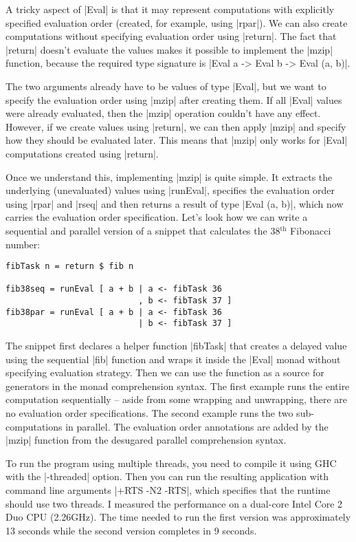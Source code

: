 \documentclass{tmr}
\renewcommand{\th}{\ensuremath{{}^\text{th}}}
\begin{document}
A tricky aspect of |Eval| is that it may represent computations with explicitly
specified evaluation order (created, for example, using |rpar|). We can also create computations 
without specifying evaluation order using |return|. The fact that |return| doesn't evaluate the 
values makes it possible to implement the |mzip| function, because the required type signature is 
|Eval a -> Eval b -> Eval (a, b)|.

The two arguments already have to be values of type |Eval|, but we want to specify the evaluation
order using |mzip| after creating them. If all |Eval| values were already evaluated, then the |mzip|
operation couldn't have any effect. However, if we create values using |return|, we can then apply
|mzip| and specify how they should be evaluated later. This means that |mzip| only works for
|Eval| computations created using |return|.

Once we understand this, implementing |mzip| is quite simple. It extracts the underlying 
(unevaluated) values using |runEval|, specifies the evaluation order using |rpar| and |rseq| and 
then returns a result of type |Eval (a, b)|, which now carries the evaluation order specification. 
Let's look how we can write a sequential and parallel version of a
snippet that calculates the
$38\th$ Fibonacci number:

\begin{verbatim}
fibTask n = return $ fib n

fib38seq = runEval [ a + b | a <- fibTask 36
                           , b <- fibTask 37 ]
fib38par = runEval [ a + b | a <- fibTask 36
                           | b <- fibTask 37 ]
\end{verbatim}

The snippet first declares a helper function |fibTask| that creates a delayed value using 
the sequential |fib| function and wraps it inside the |Eval| monad without specifying evaluation
strategy. Then we can use the function as a source for generators in the monad comprehension
syntax. The first example runs the entire computation sequentially -- aside from some wrapping
and unwrapping, there are no evaluation order specifications. The second example runs the 
two sub-computations in parallel. The evaluation order annotations are added by the |mzip| 
function from the desugared parallel comprehension syntax.

To run the program using multiple threads, you need to compile it using GHC with the |-threaded|
option. Then you can run the resulting application with command line arguments |+RTS -N2 -RTS|,
which specifies that the runtime should use two threads. I measured the performance on a dual-core 
Intel Core 2 Duo CPU (2.26GHz). The time needed to run the first version was approximately 13 
seconds while the second version completes in 9 seconds.
\end{document}
